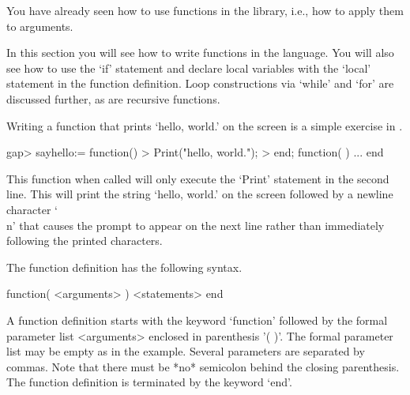 


You  have already  seen how to   use functions in the {\GAP}  library,
i.e., how to apply them to arguments.

In this section  you will see  how to  write  functions in  the {\GAP}
language.  You will also see how to use the `if' statement and declare
local variables with the `local' statement in the function definition.
Loop constructions via `while' and `for' are discussed further, as are
recursive functions.


Writing a function that prints `hello, world.'  on the screen is a simple
exercise in {\GAP}.

\beginexample
gap> sayhello:= function()
> Print("hello, world.\n");
> end;
function(  ) ... end
\endexample

This function when called will only execute the  `Print' statement in the
second line.  This will  print the string  `hello, world.'  on the screen
followed by a  newline character `\\n' that causes  the {\GAP} prompt  to
appear  on the next  line rather  than  immediately following the printed
characters.

The function definition has the following syntax.

\)\fmark function( <arguments> ) <statements> end

A function definition starts with the keyword `function' followed by
the formal parameter list <arguments> enclosed in parenthesis '( )'.
The formal parameter list may be empty as in the example.  Several
parameters are separated by commas.  Note that there must be *no*
semicolon behind the closing parenthesis.  The function definition is
terminated by the keyword `end'.


